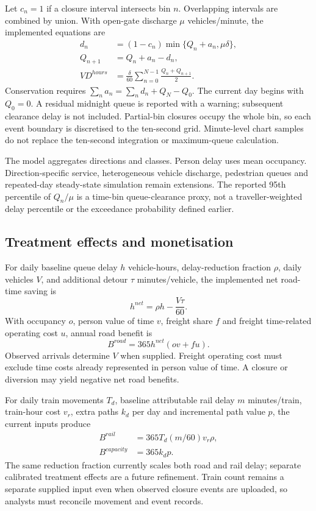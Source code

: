 \documentclass[11pt,a4paper]{article}
\begin{document}
Let $c_n=1$ if a closure interval intersects bin $n$. Overlapping intervals are combined by union. With open-gate discharge $\mu$ vehicles/minute, the implemented equations are
\begin{align}
 d_n&=(1-c_n)\min\{Q_n+a_n,\mu\delta\},\\
 Q_{n+1}&=Q_n+a_n-d_n,\\
 VD^{hours}&=\frac{\delta}{60}\sum_{n=0}^{N-1}\frac{Q_n+Q_{n+1}}{2}.
\end{align}
Conservation requires $\sum_n a_n=\sum_n d_n+Q_N-Q_0$. The current day begins with $Q_0=0$. A residual midnight queue is reported with a warning; subsequent clearance delay is not included. Partial-bin closures occupy the whole bin, so each event boundary is discretised to the ten-second grid. Minute-level chart samples do not replace the ten-second integration or maximum-queue calculation.

The model aggregates directions and classes. Person delay uses mean occupancy. Direction-specific service, heterogeneous vehicle discharge, pedestrian queues and repeated-day steady-state simulation remain extensions. The reported 95th percentile of $Q_n/\mu$ is a time-bin queue-clearance proxy, not a traveller-weighted delay percentile or the exceedance probability defined earlier.

\subsection{Treatment effects and monetisation}
For daily baseline queue delay $h$ vehicle-hours, delay-reduction fraction $\rho$, daily vehicles $V$, and additional detour $\tau$ minutes/vehicle, the implemented net road-time saving is
\begin{equation}
 h^{net}=\rho h-\frac{V\tau}{60}.
\end{equation}
With occupancy $o$, person value of time $v$, freight share $f$ and freight time-related operating cost $u$, annual road benefit is
\begin{equation}
 B^{road}=365h^{net}(ov+fu).
\end{equation}
Observed arrivals determine $V$ when supplied. Freight operating cost must exclude time costs already represented in person value of time. A closure or diversion may yield negative net road benefits.

For daily train movements $T_d$, baseline attributable rail delay $m$ minutes/train, train-hour cost $v_r$, extra paths $k_d$ per day and incremental path value $p$, the current inputs produce
\begin{align}
 B^{rail}&=365T_d(m/60)v_r\rho,\\
 B^{capacity}&=365k_dp.
\end{align}
The same reduction fraction currently scales both road and rail delay; separate calibrated treatment effects are a future refinement. Train count remains a separate supplied input even when observed closure events are uploaded, so analysts must reconcile movement and event records.
\end{document}
